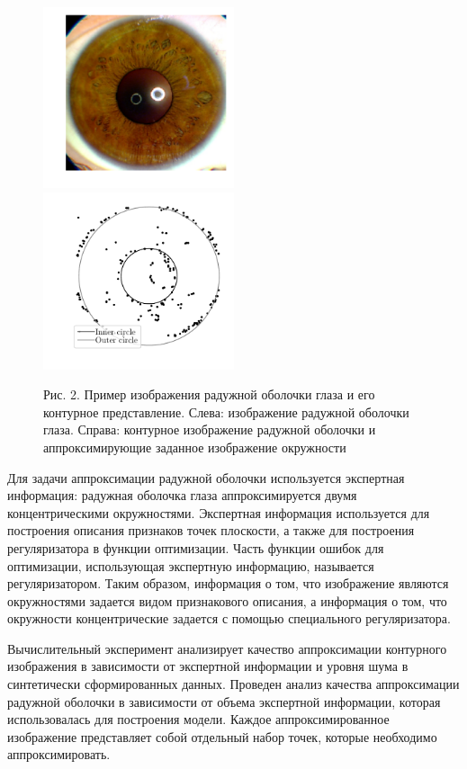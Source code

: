 \documentclass[12pt]{a&t}
\begin{document}
\begin{figure}[h!]
\includegraphics[width=0.5\textwidth]{real_image}
\includegraphics[width=0.5\textwidth]{outline_image}
\caption{Рис. 2. Пример изображения радужной оболочки глаза и его контурное представление. Слева: изображение радужной оболочки глаза. Справа: контурное изображение радужной оболочки и аппроксимирующие заданное изображение окружности}
\label{intro:fig1}
\end{figure}

Для задачи аппроксимации радужной оболочки используется экспертная информация: радужная оболочка глаза аппроксимируется двумя концентрическими окружностями.
Экспертная информация используется для построения описания признаков точек плоскости, а также для построения регуляризатора в функции оптимизации.
Часть функции ошибок для оптимизации, использующая экспертную информацию, называется регуляризатором.
Таким образом, информация о том, что изображение являются окружностями задается видом признакового описания, а информация о том, что окружности концентрические задается с помощью специального регуляризатора.

Вычислительный эксперимент анализирует качество аппроксимации контурного изображения в зависимости от экспертной информации и уровня шума в синтетически сформированных данных. Проведен анализ качества аппроксимации радужной оболочки в зависимости от объема экспертной информации, которая использовалась для построения модели.
Каждое аппроксимированное изображение представляет собой отдельный набор точек, которые необходимо аппроксимировать.
\end{document}
